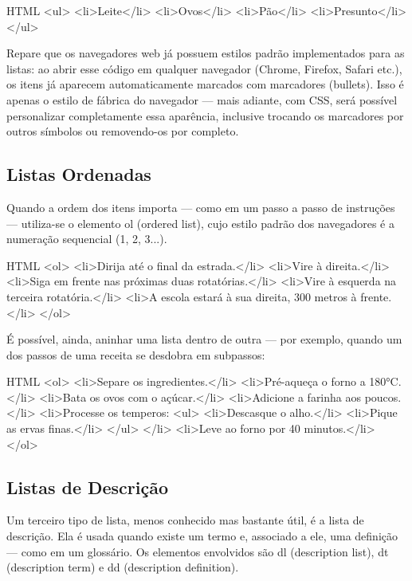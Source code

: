 \begin{codebox}{HTML}
 <ul>
   <li>Leite</li>
   <li>Ovos</li>
   <li>Pão</li>
   <li>Presunto</li>
 </ul>
\end{codebox}

Repare que os navegadores web já possuem estilos padrão implementados para as listas: ao abrir esse código em qualquer navegador (Chrome, Firefox, Safari etc.), os itens já aparecem automaticamente marcados com marcadores (bullets). Isso é apenas o estilo de fábrica do navegador — mais adiante, com CSS, será possível personalizar completamente essa aparência, inclusive trocando os marcadores por outros símbolos ou removendo-os por completo.

\subsection{Listas Ordenadas}

Quando a ordem dos itens importa — como em um passo a passo de instruções — utiliza-se o elemento ol (ordered list), cujo estilo padrão dos navegadores é a numeração sequencial (1, 2, 3...).

\begin{codebox}{HTML}
<ol>
  <li>Dirija até o final da estrada.</li>
  <li>Vire à direita.</li>
  <li>Siga em frente nas próximas duas rotatórias.</li>
  <li>Vire à esquerda na terceira rotatória.</li>
  <li>A escola estará à sua direita, 300 metros à frente.</li>
</ol>
\end{codebox}

É possível, ainda, aninhar uma lista dentro de outra — por exemplo, quando um dos passos de uma receita se desdobra em subpassos:

\begin{codebox}{HTML}
<ol>
  <li>Separe os ingredientes.</li>
  <li>Pré-aqueça o forno a 180°C.</li>
  <li>Bata os ovos com o açúcar.</li>
  <li>Adicione a farinha aos poucos.</li>
  <li>Processe os temperos:
    <ul>
      <li>Descasque o alho.</li>
      <li>Pique as ervas finas.</li>
    </ul>
  </li>
  <li>Leve ao forno por 40 minutos.</li>
</ol>
\end{codebox}

\subsection{Listas de Descrição}

Um terceiro tipo de lista, menos conhecido mas bastante útil, é a lista de descrição. Ela é usada quando existe um termo e, associado a ele, uma definição — como em um glossário. Os elementos envolvidos são dl (description list), dt (description term) e dd (description definition).

